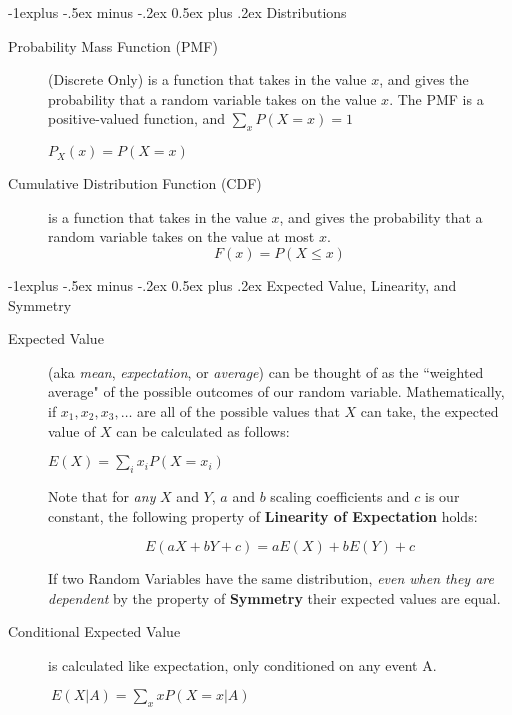 \documentclass[10pt,landscape]{article}
\makeatletter
\renewcommand{\subsection}{\@startsection{subsection}{2}{0mm}%
                                {-1explus -.5ex minus -.2ex}%
                                {0.5ex plus .2ex}%
                                {\normalfont\normalsize\bfseries}}
\makeatother
\begin{document}
\begin{multicols}{3}
\subsection{Distributions}
\begin{description}

\item[Probability Mass Function (PMF)] (Discrete Only) is a function that takes in the value $x$, and gives the probability that a random variable takes on the value $x$. The PMF is a positive-valued function, and $\sum_xP(X=x) = 1$
\begin{center}
$P_X(x) = P(X=x)$
\end{center}

\item[Cumulative Distribution Function (CDF)] is a function that takes in the value $x$, and gives the probability that a random variable takes on the value at most $x$.
\[F(x) = P(X \leq x)\]


\end{description}


\subsection{Expected Value, Linearity, and Symmetry}
\begin{description}
\item[Expected Value] (aka \emph{mean}, \emph{expectation}, or \emph{average}) can be thought of as the ``weighted average" of the possible outcomes of our random variable. Mathematically, if $x_1, x_2, x_3, \dots$ are all of the possible values that $X$ can take, the expected value of $X$ can be calculated as follows:
\begin{center}
$E(X) = \sum\limits_{i}x_iP(X=x_i)$
\end{center}
Note that for \emph{any} $X$ and $Y$, $a$ and $b$ scaling coefficients and $c$ is our constant, the following property of \textbf{Linearity of Expectation} holds:

\[E(aX + bY + c) = aE(X) + bE(Y) + c \]

If two Random Variables have the same distribution, \emph{even when they are dependent} by the property of \textbf{Symmetry} their expected values are equal.



\item[Conditional Expected Value] is calculated like expectation, only conditioned on any event A. \begin{center}
$\ E(X | A) = \sum\limits_{x}xP(X=x | A)$
\end{center}


\end{description}
\end{multicols}
\end{document}

